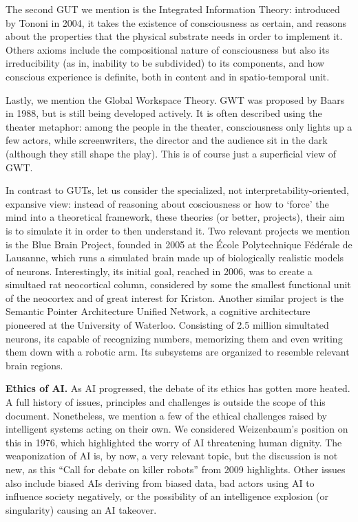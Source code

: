 \documentclass[../main.tex]{subfiles}
\begin{document}
The second GUT we mention is the Integrated Information Theory: introduced by Tononi in 2004\cite{tononiInformationIntegrationTheory2004}, it takes the existence of consciousness as certain, and reasons about the properties that the physical substrate needs in order to implement it. Others axioms include the compositional nature of consciousness but also its irreducibility (as in, inability to be subdivided) to its components, and how conscious experience is definite, both in content and in spatio-temporal unit.

Lastly, we mention the Global Workspace Theory. GWT was proposed by Baars in 1988\cite{baarsCognitiveTheoryConsciousness1988}, but is still being developed actively. It is often described using the theater metaphor: among the people in the theater, consciousness only lights up a few actors, while screenwriters, the director and the audience sit in the dark (although they still shape the play). This is of course just a superficial view of GWT.

In contrast to GUTs, let us consider the specialized, not interpretability-oriented, expansive view: instead of reasoning about cosciousness or how to `force' the mind into a theoretical framework, these theories (or better, projects), their aim is to simulate it in order to then understand it. Two relevant projects we mention is the Blue Brain Project, founded in 2005 at the École Polytechnique Fédérale de Lausanne, which runs a  simulated brain made up of biologically realistic models of neurons. Interestingly, its initial goal, reached in 2006, was to create a simultaed rat neocortical column, considered by some the smallest functional unit of the neocortex and of great interest for Kriston. Another similar project is the Semantic Pointer Architecture Unified Network, a cognitive architecture pioneered at the University of Waterloo. Consisting of 2.5 million simultated neurons, its capable of recognizing numbers, memorizing them and even writing them down with a robotic arm. Its subsystems are organized to resemble relevant brain regions.

\textbf{Ethics of AI.} As AI progressed, the debate of its ethics has gotten more heated. A full history of issues, principles and challenges is outside the scope of this document. Nonetheless, we mention a few of the ethical challenges raised by intelligent systems acting on their own. We considered Weizenbaum's position on this in 1976, which highlighted the worry of AI threatening human dignity. The weaponization of AI is, by now, a very relevant topic, but the discussion is not new, as this ``Call for debate on killer robots''\cite{BBCNEWSTechnology} from 2009 highlights. Other issues also include biased AIs deriving from biased data, bad actors using AI to influence society negatively, or the possibility of an intelligence explosion (or singularity) causing an AI takeover\cite{bostromEthicalIssuesAdvanced2003}.
\end{document}
